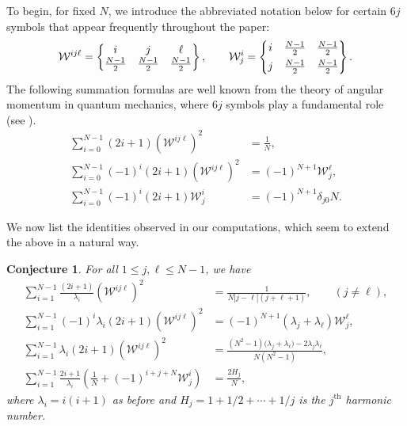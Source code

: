 \documentclass[11pt]{amsart}
\numberwithin{equation}{section}
\newtheorem{conjecture}{Conjecture}
\theoremstyle{definition}
\newcommand\sixJ[3]{\left\{\begin{matrix}
#1 & #2 & #3 \\
\frac{N-1}{2} & \frac{N-1}{2} & \frac{N-1}{2}
\end{matrix}
\right\}}
\begin{document}
To begin, for fixed $N$, we introduce the abbreviated notation below for certain $6j$ symbols that appear frequently throughout the paper:
\begin{equation}\label{eq_sixj_abbrev}
\mathcal{W}^{ij\ell} = \sixJ{i}{j}{\ell}, \qquad \mathcal{W}_j^i = \left\{\begin{matrix}
i & \frac{N-1}{2} & \frac{N-1}{2}
\vspace{0.15cm} \\ 
j & \frac{N-1}{2} & \frac{N-1}{2}
\end{matrix}
\right\}.
\end{equation}
The following summation formulas are well known from the theory of angular momentum in quantum mechanics, where $6j$ symbols play a fundamental role (see \cite{Varshalovich1988quantum}). 
\begin{align}
\sum\limits_{i = 0}^{N-1} (2i+1)(\mathcal{W}^{ij\ell})^2
&= \frac{1}{N}, \label{eq_sum_6j}
\\
\sum\limits_{i = 0}^{N-1}
(-1)^i(2i+1)(\mathcal{W}^{ij\ell})^2
&= (-1)^{N+1}\mathcal{W}_j^{\ell}, \label{eq_sum_6j_2}
\\ 
\sum\limits_{i = 0}^{N-1} (-1)^i(2i+1)
\mathcal{W}_j^i &= (-1)^{N+1}\delta_{j0}N.
\label{eq_sum_alternating}
\end{align}


We now list the identities observed in our computations, which seem to extend the  above in a natural way.

\begin{conjecture}\label{conj_new_formulas}
For all $1 \leq j, \ell \leq N-1$, we have
\begin{align}
\sum\limits_{i = 1}^{N-1} \frac{(2i+1)}{\lambda_{i}}
(\mathcal{W}^{ij\ell})^2 &= \frac{1}{N|j - \ell|(j + \ell + 1)}, \qquad (j\neq \ell), \label{intro_alt_lambda_small} \\
\sum\limits_{i = 1}^{N-1} (-1)^{i} \lambda_{i}(2i+1)
(\mathcal{W}^{ij\ell})^2 &=(-1)^{N+1}(\lambda_j + \lambda_{\ell})\mathcal{W}_j^{\ell}, \label{intro_alt_lambda} \\
\sum\limits_{i = 1}^{N-1} \lambda_{i}(2i+1)
(\mathcal{W}^{ij\ell})^2 &= \frac{(N^2-1)\big(\lambda_j+\lambda_{\ell}\big) - 2\lambda_j\lambda_{\ell}}{N(N^2-1)}, \label{intro_non_alt_lambda} \\
\sum\limits_{i = 1}^{N-1}\frac{2i+1}{\lambda_i}\left(\frac{1}{N} + (-1)^{i+j+N}\mathcal{W}_j^i\right) &= \frac{2H_j}{N},\label{intro_eq_harmonic}
\end{align}
where $\lambda_i = i(i+1)$ as before and $H_j = 1 + 1/2 + \cdots + 1/j$ is the $j^{\text{th}}$ harmonic number.
\end{conjecture}
\end{document}
